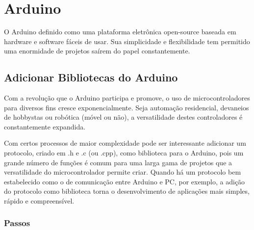 \section{Arduino}

O Arduino definido como uma plataforma eletrônica open-source baseada em hardware e software fáceis de usar. Sua simplicidade e flexibilidade tem permitido uma enormidade de projetos saírem do papel constantemente.

\subsection{Adicionar Bibliotecas do Arduino}

Com a revolução que o Arduino participa e promove, o uso de microcontroladores para diversos fins cresce exponencialmente. Seja automação residencial, devaneios de hobbystas ou robótica (móvel ou não), a versatilidade destes controladores é constantemente expandida. 

Com certos processos de maior complexidade pode ser interessante adicionar um protocolo, criado em .h e .c (ou .cpp), como biblioteca para o Arduino, pois um grande número de funções é comum para uma larga gama de projetos que a versatilidade do microcontrolador permite criar. Quando há um protocolo bem estabelecido como o de comunicação entre Arduino e PC, por exemplo, a adição do protocolo como biblioteca torna o desenvolvimento de aplicações mais simples, rápido e compreensível.

\subsubsection{Passos}

